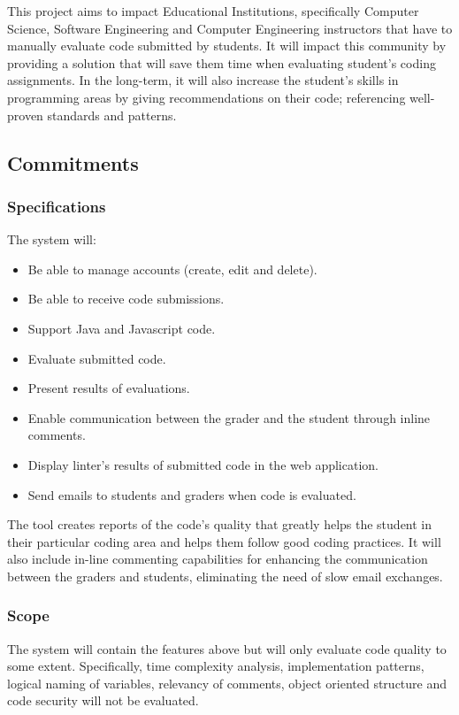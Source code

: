 
This project aims to impact Educational Institutions, specifically Computer
Science, Software Engineering and Computer Engineering instructors that have to
manually evaluate code submitted by students. It will impact this community by
providing a solution that will save them time when evaluating
student's coding assignments. In the long-term, it will also increase the
student's skills in programming areas by giving recommendations on their code;
referencing well-proven standards and patterns.

\subsection{Commitments}
\subsubsection*{Specifications}
The system will:
\begin{itemize}
\item Be able to manage accounts (create, edit and delete).
\item Be able to receive code submissions.
\item Support Java and Javascript code.
\item Evaluate submitted code.
\item Present results of evaluations.
\item Enable communication between the grader and the student through
inline comments.
\item Display linter's results of submitted code in the web application.
\item Send emails to students and graders when code is evaluated.
\end{itemize}

The tool creates reports of the code's quality that greatly helps the student
in their particular coding area and helps them follow good coding practices. It
will also include in-line commenting capabilities for enhancing the
communication between the graders and students, eliminating the need of slow
email exchanges.

\subsubsection*{Scope}

The system will contain the features above but will only evaluate code quality
to some extent. Specifically, time complexity analysis, implementation patterns,
logical naming of variables, relevancy of comments, object oriented structure
and code security will not be evaluated.

